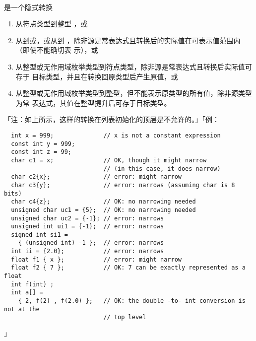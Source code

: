 \paragraph{}
是一个隐式转换
\begin{enumerate}
  \item{从符点类型到整型 ，或}
  \item{从到或，或从到
    ，除非源是常表达式且转换后的实际值在可表示值范围内（即使不能确切表
    示），或}
  \item{从整型或无作用域枚举类型到符点类型，除非源是常表达式且转换后实际值可存于
    目标类型，并且在转换回原类型后产生原值，或}
  \item{从整型或无作用域枚举类型到整型，但不能表示原类型的所有值，除非源类型为常
    表达式，其值在整型提升后可存于目标类型。}
\end{enumerate}
「注：如上所示，这样的转换在列表初始化的顶层是不允许的。」「例：
\begin{lstlisting}
  int x = 999;              // x is not a constant expression
  const int y = 999;
  const int z = 99;
  char c1 = x;              // OK, though it might narrow
                            // (in this case, it does narrow)
  char c2{x};               // error: might narrow
  char c3{y};               // error: narrows (assuming char is 8 bits)
  char c4{z};               // OK: no narrowing needed
  unsigned char uc1 = {5};  // OK: no narrowing needed
  unsigned char uc2 = {-1}; // error: narrows
  unsigned int ui1 = {-1};  // error: narrows
  signed int si1 =
    { (unsigned int) -1 };  // error: narrows
  int ii = {2.0};           // error: narrows
  float f1 { x };           // error: might narrow
  float f2 { 7 };           // OK: 7 can be exactly represented as a float
  int f(int) ;
  int a[] =
    { 2, f(2) , f(2.0) };   // OK: the double -to- int conversion is not at the
                            // top level
\end{lstlisting}」
